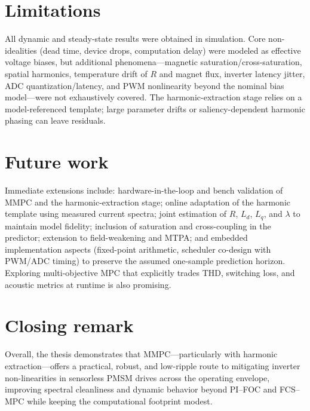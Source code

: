 \section*{Limitations}
All dynamic and steady-state results were obtained in simulation. Core non-idealities (dead time, device drops, computation delay) were modeled as effective voltage biases, but additional phenomena—magnetic saturation/cross-saturation, spatial harmonics, temperature drift of $R$ and magnet flux, inverter latency jitter, ADC quantization/latency, and PWM nonlinearity beyond the nominal bias model—were not exhaustively covered. The harmonic-extraction stage relies on a model-referenced template; large parameter drifts or saliency-dependent harmonic phasing can leave residuals.

\section*{Future work}
Immediate extensions include: hardware-in-the-loop and bench validation of MMPC and the harmonic-extraction stage; online adaptation of the harmonic template using measured current spectra; joint estimation of $R$, $L_d$, $L_q$, and $\lambda$ to maintain model fidelity; inclusion of saturation and cross-coupling in the predictor; extension to field-weakening and MTPA; and embedded implementation aspects (fixed-point arithmetic, scheduler co-design with PWM/ADC timing) to preserve the assumed one-sample prediction horizon. Exploring multi-objective MPC that explicitly trades THD, switching loss, and acoustic metrics at runtime is also promising.

\section*{Closing remark}
Overall, the thesis demonstrates that MMPC—particularly with harmonic extraction—offers a practical, robust, and low-ripple route to mitigating inverter non-linearities in sensorless PMSM drives across the operating envelope, improving spectral cleanliness and dynamic behavior beyond PI–FOC and FCS–MPC while keeping the computational footprint modest.






